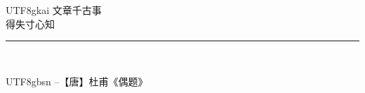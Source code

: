 \chapter*{~}


    
    


\begin{center}                      %
\vspace*{2.0in}                     %
\begin{onehalfspacing}
    \begin{CJK*}{UTF8}{gkai}
    {
    \Large \hspace{-1.2cm}文章千古事\\
    \vspace{0.3cm}\hspace{1.0cm}得失寸心知
    \vspace{0.2cm}
    } \\
    
    \end{CJK*}
    \rule{1.5in}{0.5pt} \\          %
    
    \begin{CJK*}{UTF8}{gbsn}
    \vspace{0.2cm}
    {\hspace{0.35cm}\large\textsc{--}【唐】杜甫《偶题》}
    \end{CJK*}
\end{onehalfspacing}
\end{center}

